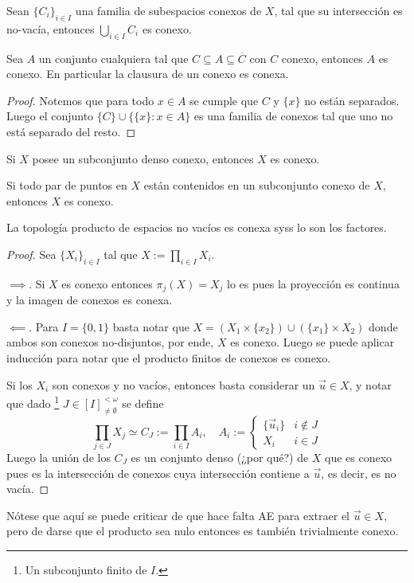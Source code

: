 \documentclass[topologia-analisis.tex]{subfiles}
\begin{document}
\begin{cor}
	Sean $\{C_i\}_{i\in I}$ una familia de subespacios conexos de $X$, tal que su intersección es no-vacía, entonces $\bigcup_{i\in I} C_i$ es conexo.
\end{cor}
\begin{cor}
	Sea $A$ un conjunto cualquiera tal que $C \subseteq A \subseteq \overline C$ con $C$ conexo, entonces $A$ es conexo.
	En particular la clausura de un conexo es conexa.
\end{cor}
\begin{proof}
	Notemos que para todo $x\in A$ se cumple que $C$ y $\{x\}$ no están separados.
	Luego el conjunto $\{C\}\cup\{\{x\} : x\in A\}$ es una familia de conexos tal que uno no está separado del resto.
\end{proof}

\begin{cor}
	Si $X$ posee un subconjunto denso conexo, entonces $X$ es conexo.
\end{cor}
\begin{cor}
	Si todo par de puntos en $X$ están contenidos en un subconjunto conexo de $X$, entonces $X$ es conexo.
\end{cor}

\begin{thm}
	La topología producto de espacios no vacíos es conexa syss lo son los factores.
\end{thm}
\begin{proof}
	Sea $\{X_i\}_{i\in I}$ tal que $X := \prod_{i\in I}X_i$.
	\par
	$\implies$. Si $X$ es conexo entonces $\pi_j(X) = X_j$ lo es pues la proyección es continua y la imagen de conexos es conexa.
	\par
	$\impliedby$.
	Para $I = \{0,1\}$ basta notar que $X = (X_1\times\{x_2\})\cup(\{x_1\}\times X_2)$ donde ambos son conexos no-disjuntos, por ende, $X$ es conexo.
	Luego se puede aplicar inducción para notar que el producto finitos de conexos es conexo.

	Si los $X_i$ son conexos y no vacíos, entonces basta considerar un $\vec u \in X$, y notar que dado%
	\footnote{Un subconjunto finito de $I$.}
	$J \in [I]^{<\omega}_{\neq\emptyset}$ se define
	$$ \prod_{j\in J} X_j \simeq C_J := \prod_{i\in I} A_i,\quad A_i := \begin{cases}\{\vec u_i\} &i\notin J \\ X_i &i\in J\end{cases}  $$
	Luego la unión de los $C_J$ es un conjunto denso (¿por qué?) de $X$ que es conexo pues es la intersección de conexos
	cuya intersección contiene a $\vec u$, es decir, es no vacía.
\end{proof}
Nótese que aquí se puede criticar de que hace falta AE para extraer el $\vec u\in X$,
pero de darse que el producto sea nulo entonces es también trivialmente conexo.
\end{document}
